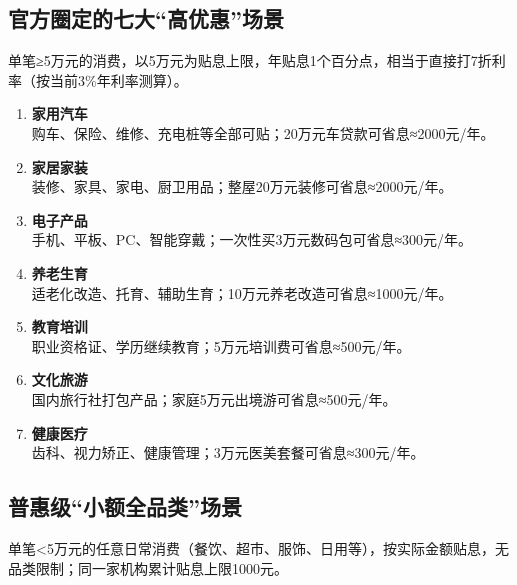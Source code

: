 \subsection{官方圈定的七大“高优惠”场景}
单笔≥5万元的消费，以5万元为贴息上限，年贴息1个百分点，相当于直接打7折利率（按当前3\%年利率测算）。
\begin{enumerate}[leftmargin=*, nosep]
  \item \textbf{家用汽车} \\  
  购车、保险、维修、充电桩等全部可贴；20万元车贷款可省息≈2000元/年。

  \item \textbf{家居家装} \\  
  装修、家具、家电、厨卫用品；整屋20万元装修可省息≈2000元/年。

  \item \textbf{电子产品} \\  
  手机、平板、PC、智能穿戴；一次性买3万元数码包可省息≈300元/年。

  \item \textbf{养老生育} \\  
  适老化改造、托育、辅助生育；10万元养老改造可省息≈1000元/年。

  \item \textbf{教育培训} \\  
  职业资格证、学历继续教育；5万元培训费可省息≈500元/年。

  \item \textbf{文化旅游} \\  
  国内旅行社打包产品；家庭5万元出境游可省息≈500元/年。

  \item \textbf{健康医疗} \\  
  齿科、视力矫正、健康管理；3万元医美套餐可省息≈300元/年。
\end{enumerate}

\subsection{普惠级“小额全品类”场景}
单笔<5万元的任意日常消费（餐饮、超市、服饰、日用等），按实际金额贴息，无品类限制；同一家机构累计贴息上限1000元。

